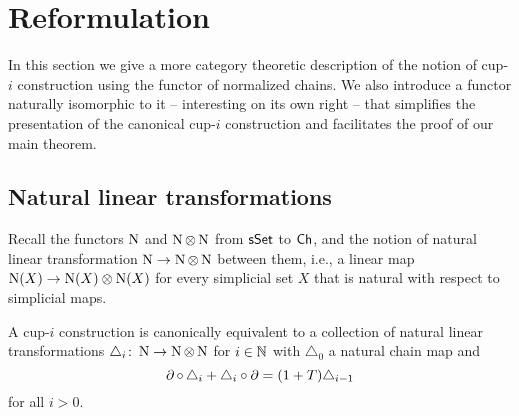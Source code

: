
\section{Reformulation} \label{s:reformulation}

In this section we give a more category theoretic description of the notion of \mbox{cup-$i$} construction using the functor of normalized chains.
We also introduce a functor naturally isomorphic to it -- interesting on its own right -- that simplifies the presentation of the canonical cup-$i$ construction and facilitates the proof of our main theorem.

\subsection{Natural linear transformations}

Recall the functors $\operatorname{N}$ and $\operatorname{N} \otimes \operatorname{N}$ from $\mathsf{sSet}$ to $\mathsf{Ch}$, and the notion of natural linear transformation $\operatorname{N} \to \operatorname{N} \otimes \operatorname{N}$ between them, i.e., a linear map $\operatorname{N}(X) \to \operatorname{N}(X) \otimes \operatorname{N}(X)$ for every simplicial set $X$ that is natural with respect to simplicial maps.

\begin{lemma} \label{l:cup-i construction coalgebra}
	A \mbox{cup-$i$} construction is canonically equivalent to a collection of natural linear transformations $\triangle_i \colon \operatorname{N} \to \operatorname{N} \otimes \operatorname{N}$ for $i \in \mathbb{N}$ with $\triangle_0$ a natural chain map and
	\[
	\operatorname{\partial} \circ \, \triangle_i + \triangle_i \circ \operatorname{\partial} =
	(1+T) \triangle_{i-1}
	\]
	for all $i > 0$.
\end{lemma}

